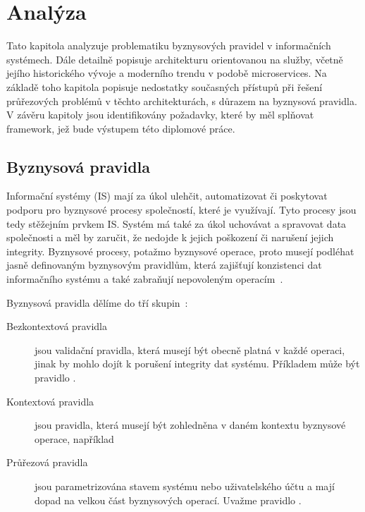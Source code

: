 
\chapter{Analýza}\label{ch:analyza}

Tato kapitola analyzuje problematiku byznysových pravidel v informačních systémech.
Dále detailně popisuje architekturu orientovanou na služby, včetně jejího historického
vývoje a moderního trendu v podobě microservices. Na základě toho kapitola popisuje nedostatky
současných přístupů při řešení průřezových problémů v těchto architekturách, s důrazem na byznysová pravidla.
V závěru kapitoly jsou identifikovány požadavky, které by měl splňovat framework,
jež bude výstupem této diplomové práce.

\section{Byznysová pravidla}

Informační systémy (IS) mají za úkol ulehčit, automatizovat či poskytovat podporu pro
byznysové procesy společností, které je využívají. Tyto procesy jsou tedy stěžejním
prvkem IS. Systém má také za úkol uchovávat a spravovat data společnosti
a měl by zaručit, že nedojde k jejich poškození či narušení jejich integrity.
Byznysové procesy, potažmo byznysové operace, proto musejí
podléhat jasně definovaným byznysovým pravidlům, která zajišťují konzistenci dat informačního
systému a také zabraňují nepovoleným operacím~\cite{cemus2015automated}.

Byznysová pravidla dělíme do tří skupin~\cite{cemus2014aspect}:
\begin{description}
    \item [Bezkontextová pravidla] jsou validační pravidla, která musejí být obecně platná
    v každé operaci, jinak by mohlo dojít k porušení integrity dat systému. Příkladem může
    být pravidlo .
    \item [Kontextová pravidla] jsou pravidla, která musejí být zohledněna v daném kontextu
    byznysové operace, například 
    \item [Průřezová pravidla] jsou parametrizována stavem systému nebo uživatelského účtu a mají
    dopad na velkou část byznysových operací. Uvažme pravidlo .
\end{description}

